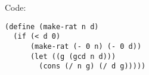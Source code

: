 \documentclass[../main.tex]{subfiles}
\begin{document}

\section{}

Code:

\begin{lstlisting}
(define (make-rat n d)
  (if (< d 0)
      (make-rat (- 0 n) (- 0 d))
      (let ((g (gcd n d)))
        (cons (/ n g) (/ d g)))))
\end{lstlisting}
\end{document}
